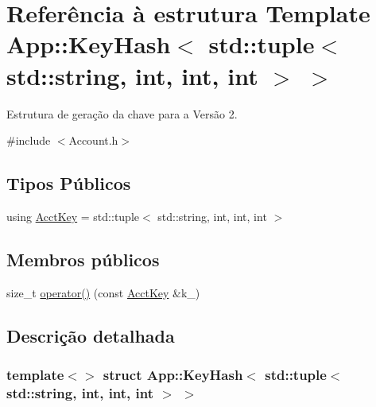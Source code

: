 \hypertarget{structApp_1_1KeyHash_3_01std_1_1tuple_3_01std_1_1string_00_01int_00_01int_00_01int_01_4_01_4}{}\section{Referência à estrutura Template App\+:\+:Key\+Hash$<$ std\+:\+:tuple$<$ std\+:\+:string, int, int, int $>$ $>$}
\label{structApp_1_1KeyHash_3_01std_1_1tuple_3_01std_1_1string_00_01int_00_01int_00_01int_01_4_01_4}


Estrutura de geração da chave para a Versão 2.  




{\ttfamily \#include $<$Account.\+h$>$}

\subsection*{Tipos Públicos}
\begin{DoxyCompactItemize}
\item 
using \hyperlink{structApp_1_1KeyHash_3_01std_1_1tuple_3_01std_1_1string_00_01int_00_01int_00_01int_01_4_01_4_a5ee36243fff70535c7d1831746625885}{Acct\+Key} = std\+::tuple$<$ std\+::string, int, int, int $>$
\end{DoxyCompactItemize}
\subsection*{Membros públicos}
\begin{DoxyCompactItemize}
\item 
size\+\_\+t \hyperlink{structApp_1_1KeyHash_3_01std_1_1tuple_3_01std_1_1string_00_01int_00_01int_00_01int_01_4_01_4_ab9c9cb7c1f627f6f991d31e8e6e0b8c8}{operator()} (const \hyperlink{structApp_1_1KeyHash_3_01std_1_1tuple_3_01std_1_1string_00_01int_00_01int_00_01int_01_4_01_4_a5ee36243fff70535c7d1831746625885}{Acct\+Key} \&k\+\_\+)
\end{DoxyCompactItemize}


\subsection{Descrição detalhada}
\subsubsection*{template$<$$>$\newline
struct App\+::\+Key\+Hash$<$ std\+::tuple$<$ std\+::string, int, int, int $>$ $>$}

